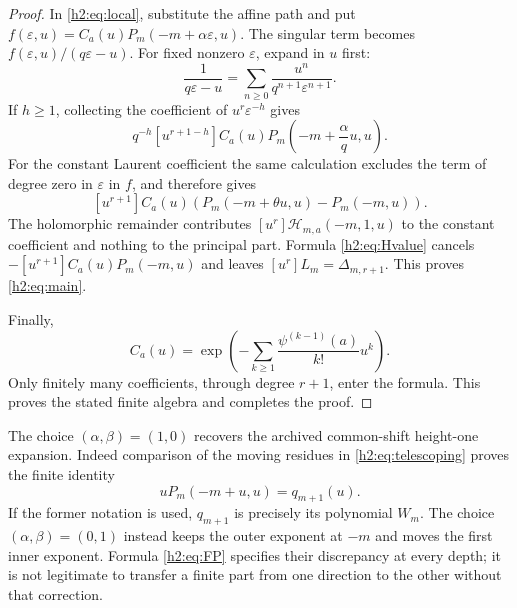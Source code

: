 \begin{proof}
In \eqref{h2:eq:local}, substitute the affine path and put
$f(\varepsilon,u)=C_a(u)P_m(-m+\alpha\varepsilon,u)$. The singular
term becomes $f(\varepsilon,u)/(q\varepsilon-u)$. For fixed nonzero
$\varepsilon$, expand in $u$ first:
\[
 \frac1{q\varepsilon-u}
    =\sum_{n\ge0}\frac{u^n}{q^{n+1}\varepsilon^{n+1}}.
\]
If $h\ge1$, collecting the coefficient of
$u^r\varepsilon^{-h}$ gives
\[
 q^{-h}[u^{r+1-h}]
       C_a(u)P_m\left(-m+\frac{\alpha}{q}u,u\right).
\]
For the constant Laurent coefficient the same calculation excludes the
term of degree zero in $\varepsilon$ in $f$, and therefore gives
\[
 [u^{r+1}]C_a(u)
   \left(P_m(-m+\theta u,u)-P_m(-m,u)\right).
\]
The holomorphic remainder contributes
$[u^r]\mathcal H_{m,a}(-m,1,u)$ to the constant coefficient and
nothing to the principal part. Formula \eqref{h2:eq:Hvalue} cancels
$-[u^{r+1}]C_a(u)P_m(-m,u)$ and leaves
$[u^r]L_m=\Delta_{m,r+1}$. This proves \eqref{h2:eq:main}.

Finally,
\[
 C_a(u)=\exp\left(-\sum_{k\ge1}
                  \frac{\psi^{(k-1)}(a)}{k!}u^k\right).
\]
Only finitely many coefficients, through degree $r+1$, enter the
formula. This proves the stated finite algebra and completes the proof.
\end{proof}

The choice $(\alpha,\beta)=(1,0)$ recovers the archived common-shift
height-one expansion. Indeed comparison of the moving residues in
\eqref{h2:eq:telescoping} proves the finite identity
\begin{equation}\label{h2:eq:recovery}
 uP_m(-m+u,u)=q_{m+1}(u).
\end{equation}
If the former notation is used, $q_{m+1}$ is precisely its polynomial
$W_m$. The choice $(\alpha,\beta)=(0,1)$ instead keeps the outer
exponent at $-m$ and moves the first inner exponent. Formula
\eqref{h2:eq:FP} specifies their discrepancy at every depth; it is
not legitimate to transfer a finite part from one direction to the
other without that correction.

